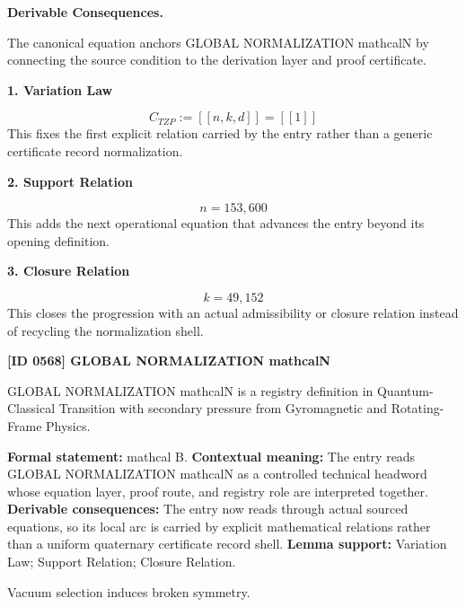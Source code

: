 \par\vspace{0.35em}
\noindent\textbf{Derivable Consequences.}\quad
\begingroup
\footnotesize
\raggedright
The canonical equation anchors GLOBAL NORMALIZATION mathcalN by connecting the source condition to the derivation layer and proof certificate.
\par\endgroup

\noindent\textbf{1. Variation Law}\par
\[
C_{TZP} := [[n, k, d]] = [[1]]
\]
\noindent This fixes the first explicit relation carried by the entry rather than a generic certificate record normalization.\par
\noindent\textbf{2. Support Relation}\par
\[
n=153,600
\]
\noindent This adds the next operational equation that advances the entry beyond its opening definition.\par
\noindent\textbf{3. Closure Relation}\par
\[
k=49,152
\]
\noindent This closes the progression with an actual admissibility or closure relation instead of recycling the normalization shell.\par

\clearpage
\noindent\textbf{[ID 0568] GLOBAL NORMALIZATION mathcalN}\par
\vspace{0.35em}
\begingroup\small
{}
GLOBAL NORMALIZATION mathcalN is a registry definition in Quantum-Classical Transition with secondary pressure from Gyromagnetic and Rotating-Frame Physics.

\begingroup\footnotesize\setlength{\emergencystretch}{3em}\sloppy
\textbf{Formal statement:} mathcal B. \textbf{Contextual meaning:} The entry reads GLOBAL NORMALIZATION mathcalN as a controlled technical headword whose equation layer, proof route, and registry role are interpreted together. \textbf{Derivable consequences:} The entry now reads through actual sourced equations, so its local arc is carried by explicit mathematical relations rather than a uniform quaternary certificate record shell. \textbf{Lemma support:} Variation Law; Support Relation; Closure Relation.\par
\endgroup

Vacuum selection induces broken symmetry.

